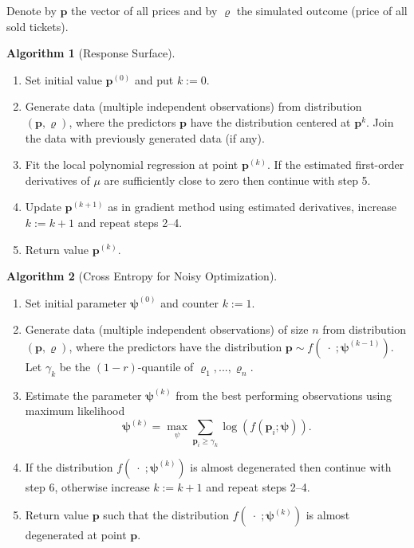 Denote by $\bm{p}$ the vector of all prices and by $\varrho$ the simulated outcome (price of all sold tickets).

\textbf{Algorithm 1} (Response Surface).
\begin{enumerate}
	\item Set initial value $\bm{p}^{(0)}$ and put $k := 0$.
	\item Generate data (multiple independent observations) from distribution $(\bm{p}, \varrho)$, where the predictors $\bm{p}$ have the distribution centered at $\bm{p}^k$. Join the data with previously generated data (if any).
	\item Fit the local polynomial regression at point $\bm{p}^{(k)}$. If the estimated first-order derivatives of $\mu$ are sufficiently close to zero then continue with step 5.
	\item Update $\bm{p}^{(k+1)}$ as in gradient method using estimated derivatives, increase $k := k+1$ and repeat steps 2--4.
	\item Return value $\bm{p}^{(k)}$.
\end{enumerate}

\textbf{Algorithm 2} (Cross Entropy for Noisy Optimization).
\begin{enumerate}
	\item Set initial parameter $\bm{\psi}^{(0)}$ and counter $k := 1$.
	\item Generate data (multiple independent observations) of size $n$ from distribution $(\bm{p}, \varrho)$, where the predictors have the distribution $\bm{p} \sim f( \;\cdot\; ; \bm{\psi}^{(k-1)})$. Let $\gamma_k$ be the $(1-r)$-quantile of $\varrho_1, ..., \varrho_n$.
	\item Estimate the parameter $\bm{\psi}^{(k)}$ from the best performing observations using maximum likelihood
	\[
		\bm{\psi}^{(k)} = \underset{\psi}{\max} \sum_{\bm{p}_i \geq \gamma_k} \log ( f ( \bm{p}_i; \bm{\psi} ) ).
	\]
	\item If the distribution $f( \;\cdot\; ; \bm{\psi}^{(k)})$ is almost degenerated then continue with step 6, otherwise increase $k := k+1$ and repeat steps 2--4.
	\item Return value $\bm{p}$ such that the distribution $f( \;\cdot\; ; \bm{\psi}^{(k)})$ is almost degenerated at point $\bm{p}$.
\end{enumerate}
